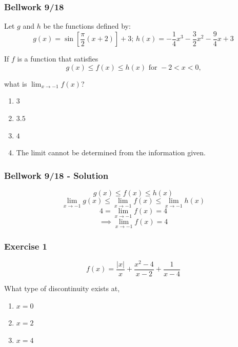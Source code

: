 \documentclass[12pt]{beamer}
\begin{document}
\begin{frame}
	\frametitle{Bellwork 9/18}
	\initclock
	Let $g$ and $h$ be the functions defined by: \[g(x) = \sin\left[\frac{\pi}{2}(x+2)\right] + 3 \text{; } h(x) = -\frac{1}{4}x^3-\frac{3}{2}x^2-\frac{9}{4}x+3\]\par
	If $f$ is a function that satisfies \[g(x)\leq f(x)\leq h(x) \text{ for } -2 < x < 0\text{,}\]\par
	what is $\displaystyle\lim_{x\to-1}f(x)$?
	\begin{enumerate}\itemsep0.5ex
		\item $3$
		\item $3.5$
		\item $4$
		\item The limit cannot be determined from the information given.
	\end{enumerate}
	\crono
\end{frame}
\begin{frame}
	\frametitle{Bellwork 9/18 - Solution}
	\large
	\vspace*{\fill}
	\vspace*{\fill}
	\vspace*{\fill}
	\vspace*{\fill}
	\[g(x)\leq f(x)\leq h(x)\]
	\vspace*{\fill}
	\[\displaystyle\lim_{x\to-1}g(x)\leq \displaystyle\lim_{x\to-1}f(x)\leq \displaystyle\lim_{x\to-1}h(x)\]
	\vspace*{\fill}
	\[4=\displaystyle\lim_{x\to-1}f(x)=4\]
	\vspace*{\fill}
	\[\implies\boxed{\displaystyle\lim_{x\to-1}f(x)=4}\]
	\vspace*{\fill}
	\vspace*{\fill}
	\vspace*{\fill}
	\vspace*{\fill}
\end{frame}
\begin{frame}
	\frametitle{Exercise 1}
	\large
	\[f(x) = \frac{|x|}{x}+\frac{x^2-4}{x-2}+\frac{1}{x-4}\]\par
	\vspace*{\fill}
	What type of discontinuity exists at,\par
	\vspace*{\fill}
	\begin{enumerate}\itemsep2ex
		\item{
		            \begin{center}
			            $x = 0$
		            \end{center}
		      }
		\item{
		            \begin{center}
			            $x = 2$
		            \end{center}
		      }
		\item{
		            \begin{center}
			            $x = 4$
		            \end{center}
		      }
	\end{enumerate}
\end{frame}
\end{document}
